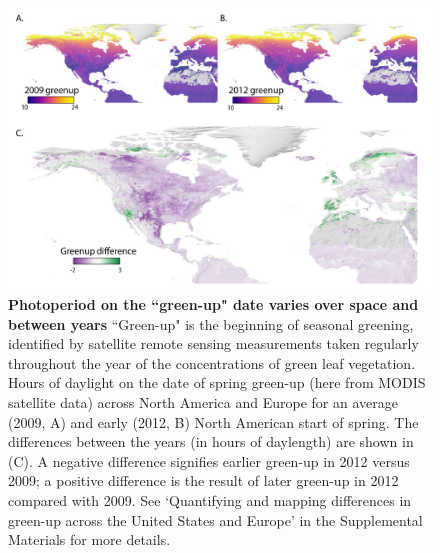 \documentclass{article}
\begin{document}
 \begin{figure}[p]
\centering
\includegraphics{..//..//docs/photoperiod/figures/Greenup_corr_lets.pdf} %
\caption{\textbf{Photoperiod on the ``green-up" date varies over space and between years} ``Green-up" is the beginning of seasonal greening, identified by satellite remote sensing measurements taken regularly throughout the year of the concentrations of green leaf vegetation. Hours of daylight on the date of spring green-up (here from MODIS satellite data) across North America and Europe for an average (2009, A) and  early (2012, B) North American start of spring. The differences between the years (in hours of daylength) are shown in (C). A negative difference signifies earlier green-up in 2012 versus 2009; a positive difference is the result of later green-up in 2012 compared with 2009. See `Quantifying and mapping differences in green-up across the United States and Europe' in the Supplemental Materials for more details. }%
 \label{fig:greenup}%
 \end{figure}
\end{document}
